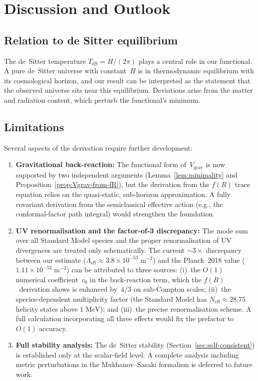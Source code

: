 \documentclass[12pt,a4paper]{article}
\theoremstyle{definition}
\theoremstyle{plain}
\theoremstyle{remark}
\newcommand{\Leff}{\Lambda_{\mathrm{eff}}}
\begin{document}
\section{Discussion and Outlook}\label{sec:discussion}

\subsection{Relation to de Sitter equilibrium}

The de~Sitter temperature $T_{\mathrm{dS}} = H/(2\pi)$ plays a central
role in our functional. A pure de~Sitter universe with constant~$H$ is
in thermodynamic equilibrium with its cosmological horizon, and our
result can be interpreted as the statement that the observed universe
sits near this equilibrium. Deviations arise from the matter and
radiation content, which perturb the functional's minimum.

\subsection{Limitations}

Several aspects of the derivation require further development:
\begin{enumerate}
  \item \textbf{Gravitational back-reaction:} The functional form
        of~$V_{\mathrm{grav}}$ is now supported by two independent
        arguments (Lemma~\ref{lem:minimality} and
        Proposition~\ref{prop:Vgrav-from-fR}), but the derivation
        from the $f(R)$ trace equation relies on the quasi-static,
        sub-horizon approximation.  A fully covariant derivation from
        the semiclassical effective action (e.g., the conformal-factor
        path integral) would strengthen the foundation.
  \item \textbf{UV renormalisation and the factor-of-3 discrepancy:}
        The mode sum over all Standard Model species and the proper
        renormalisation of UV divergences are treated only schematically.
        The current $\sim\!3\times$ discrepancy between our estimate
        ($\Leff \approx 3.8 \times 10^{-53}\;\mathrm{m}^{-2}$) and
        the Planck~2018 value ($1.11 \times 10^{-52}\;\mathrm{m}^{-2}$)
        can be attributed to three sources: (i)~the $O(1)$ numerical
        coefficient~$c_0$ in the back-reaction term, which the
        $f(R)$~derivation shows is enhanced by~$4/3$ on sub-Compton
        scales; (ii)~the species-dependent multiplicity factor (the
        Standard Model has $N_{\mathrm{eff}} \approx 28.75$ helicity
        states above $1\;\mathrm{MeV}$); and (iii)~the precise
        renormalisation scheme.  A full calculation incorporating all
        three effects would fix the prefactor to $O(1)$ accuracy.
  \item \textbf{Full stability analysis:} The de~Sitter stability
        (Section~\ref{sec:self-consistent}) is established only at the
        scalar-field level.  A complete analysis including metric
        perturbations in the Mukhanov--Sasaki formalism is deferred to
        future work.
\end{enumerate}
\end{document}

